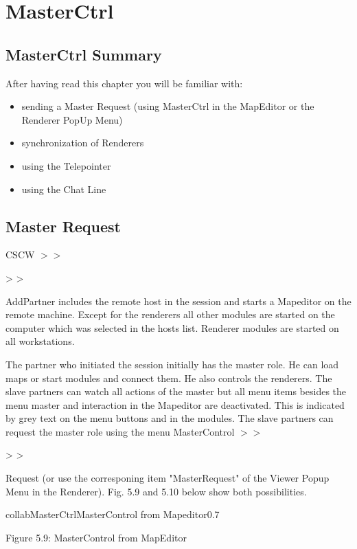 \section{MasterCtrl}
\label{Master Control}

\subsection{MasterCtrl Summary}

After having read this chapter you will be familiar with:

\begin{itemize}
\item sending a Master Request (using MasterCtrl in the MapEditor or the Renderer PopUp Menu)
\item synchronization of Renderers
\item using the Telepointer
\item using the Chat Line
\end{itemize}

\subsection{Master Request}

CSCW \latexonly $>>$ \endlatexonly \begin{htmlonly} > > \end{htmlonly} AddPartner includes the remote host in the session and starts a Mapeditor 
on the remote machine. Except for the renderers all other modules are started on the 
computer which was selected in the hosts list. Renderer modules are started on all 
workstations.

The partner who initiated the session initially has the master role. He can load maps 
or start modules and connect them. He also controls the renderers. The slave partners 
can watch all actions of the master but all menu items besides the menu master and 
interaction in the Mapeditor are deactivated. This is indicated by grey text on the menu buttons and in
the modules. The slave partners can request the master role using the menu 
MasterControl \latexonly $>>$ \endlatexonly \begin{htmlonly} > > \end{htmlonly} Request
(or use the corresponing item "MasterRequest" of the Viewer Popup Menu in the Renderer).
Fig. 5.9 and 5.10 below show both possibilities.

\begin{covimg}{collab}{MasterCtrl}{MasterControl from Mapeditor}{0.7}\end{covimg}
\begin{htmlonly}
Figure 5.9: MasterControl from MapEditor
\vspace{0.5cm}
\end{htmlonly}

